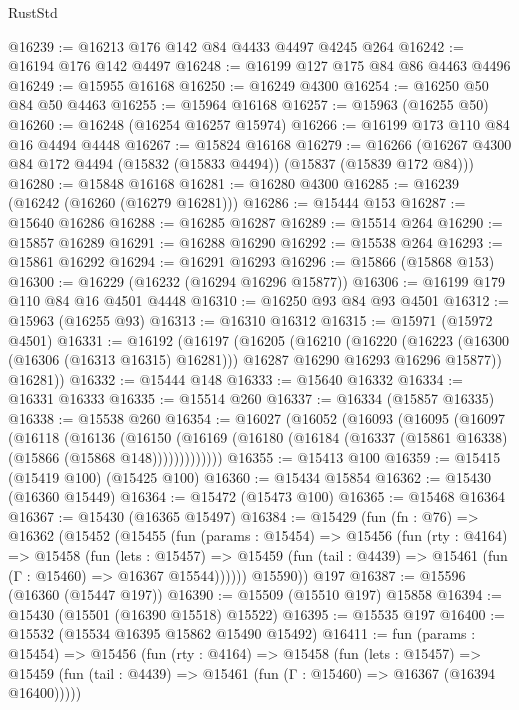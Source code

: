 \begin{lexlean}{RustStd}
\begin{coremodule}
@16239 := @16213 @176 @142 @84 @4433 @4497 @4245 @264
@16242 := @16194 @176 @142 @4497
@16248 := @16199 @127 @175 @84 @86 @4463 @4496
@16249 := @15955 @16168
@16250 := @16249 @4300
@16254 := @16250 @50 @84 @50 @4463
@16255 := @15964 @16168
@16257 := @15963 (@16255 @50)
@16260 := @16248 (@16254 @16257 @15974)
@16266 := @16199 @173 @110 @84 @16 @4494 @4448
@16267 := @15824 @16168
@16279 := @16266 (@16267 @4300 @84 @172 @4494 (@15832 (@15833 @4494)) (@15837 (@15839 @172 @84)))
@16280 := @15848 @16168
@16281 := @16280 @4300
@16285 := @16239 (@16242 (@16260 (@16279 @16281)))
@16286 := @15444 @153
@16287 := @15640 @16286
@16288 := @16285 @16287
@16289 := @15514 @264
@16290 := @15857 @16289
@16291 := @16288 @16290
@16292 := @15538 @264
@16293 := @15861 @16292
@16294 := @16291 @16293
@16296 := @15866 (@15868 @153)
@16300 := @16229 (@16232 (@16294 @16296 @15877))
@16306 := @16199 @179 @110 @84 @16 @4501 @4448
@16310 := @16250 @93 @84 @93 @4501
@16312 := @15963 (@16255 @93)
@16313 := @16310 @16312
@16315 := @15971 (@15972 @4501)
@16331 := @16192
    (@16197
      (@16205
        (@16210
          (@16220
            (@16223 (@16300 (@16306 (@16313 @16315) @16281)))
            @16287
            @16290
            @16293
            @16296
            @15877))
        @16281))
@16332 := @15444 @148
@16333 := @15640 @16332
@16334 := @16331 @16333
@16335 := @15514 @260
@16337 := @16334 (@15857 @16335)
@16338 := @15538 @260
@16354 := @16027
    (@16052
      (@16093
        (@16095
          (@16097
            (@16118
              (@16136
                (@16150
                  (@16169 (@16180 (@16184 (@16337 (@15861 @16338) (@15866 (@15868 @148)))))))))))))
@16355 := @15413 @100
@16359 := @15415 (@15419 @100) (@15425 @100)
@16360 := @15434 @15854
@16362 := @15430 (@16360 @15449)
@16364 := @15472 (@15473 @100)
@16365 := @15468 @16364
@16367 := @15430 (@16365 @15497)
@16384 := @15429
    (fun (fn : @76) =>
    @16362
      (@15452
        (@15455
          (fun (params : @15454) =>
          @15456
            (fun (rty : @4164) =>
            @15458
              (fun (lets : @15457) =>
              @15459 (fun (tail : @4439) => @15461 (fun (Γ : @15460) => @16367 @15544))))))
        @15590))
    @197
@16387 := @15596 (@16360 (@15447 @197))
@16390 := @15509 (@15510 @197) @15858
@16394 := @15430 (@15501 (@16390 @15518) @15522)
@16395 := @15535 @197
@16400 := @15532 (@15534 @16395 @15862 @15490 @15492)
@16411 := fun (params : @15454) =>
  @15456
    (fun (rty : @4164) =>
    @15458
      (fun (lets : @15457) =>
      @15459 (fun (tail : @4439) => @15461 (fun (Γ : @15460) => @16367 (@16394 @16400)))))

\end{coremodule}
\end{lexlean}
